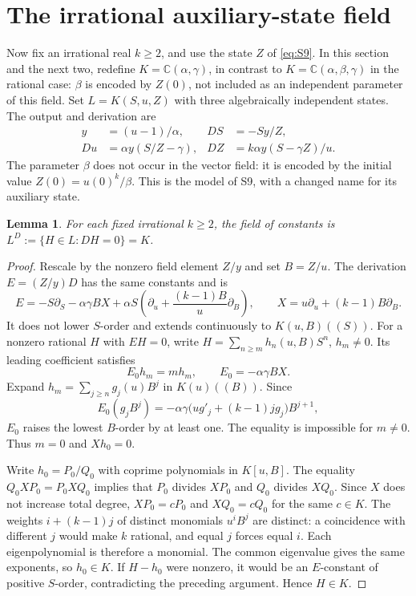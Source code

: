 \documentclass[10pt,a4paper]{article}
\newtheorem{lemma}[theorem]{Lemma}
\theoremstyle{definition}\newtheorem{definition}[theorem]{Definition}
\newcommand{\C}{\mathbb C}
\begin{document}
\section{The irrational auxiliary-state field}
\label{sec:irrational}
Now fix an irrational real $k\geq2$, and use the state $Z$ of
\eqref{eq:S9}. In this section and the next two, redefine
$K=\C(\alpha,\gamma)$, in contrast to $K=\C(\alpha,\beta,\gamma)$
in the rational case: $\beta$ is encoded by $Z(0)$, not included as an
independent parameter of this field. Set $L=K(S,u,Z)$ with three
algebraically independent states. The output
and derivation are
\begin{equation}
\begin{aligned}
y&=(u-1)/\alpha, & DS&=-Sy/Z,\\
Du&=\alpha y(S/Z-\gamma), &
DZ&=k\alpha y(S-\gamma Z)/u.
\end{aligned}
\label{eq:irrmodel}
\end{equation}
The parameter $\beta$ does not occur in the vector field: it is encoded
by the initial value $Z(0)=u(0)^k/\beta$. This is the model of S9,
with a changed name for its auxiliary state.

\begin{lemma}
\label{lem:irrconstants}
For each fixed irrational $k\geq2$, the field of constants is
$L^D:=\{H\in L:DH=0\}=K$.
\end{lemma}
\begin{proof}
Rescale by the nonzero field element $Z/y$ and set $B=Z/u$. The
derivation $E=(Z/y)D$ has the same constants and is
\begin{equation}
E=-S\partial_S-\alpha\gamma B X+
 \alpha S\left(\partial_u+\frac{(k-1)B}{u}\partial_B\right),
\qquad X=u\partial_u+(k-1)B\partial_B.
\label{eq:irrE}
\end{equation}
It does not lower $S$-order and extends continuously to
$K(u,B)((S))$. For a nonzero rational $H$ with $EH=0$, write
$H=\sum_{n\geq m}h_n(u,B)S^n$, $h_m\ne0$. Its leading coefficient
satisfies
\[
E_0h_m=mh_m,\qquad E_0=-\alpha\gamma B X.
\]
Expand $h_m=\sum_{j\geq n}g_j(u)B^j$ in $K(u)((B))$. Since
\[
E_0(g_jB^j)=-\alpha\gamma\bigl(ug'_j+(k-1)jg_j\bigr)B^{j+1},
\]
$E_0$ raises the lowest $B$-order by at least one. The equality is
impossible for $m\ne0$. Thus $m=0$ and $Xh_0=0$.

Write $h_0=P_0/Q_0$ with coprime polynomials in $K[u,B]$.
The equality $Q_0XP_0=P_0XQ_0$ implies that $P_0$ divides $XP_0$
and $Q_0$ divides $XQ_0$. Since $X$ does not increase total degree,
$XP_0=cP_0$ and $XQ_0=cQ_0$ for the same $c\in K$.
The weights $i+(k-1)j$ of distinct monomials $u^iB^j$ are distinct:
a coincidence with different $j$ would make $k$ rational, and equal
$j$ forces equal $i$. Each eigenpolynomial is therefore a monomial.
The common eigenvalue gives the same exponents, so $h_0\in K$.
If $H-h_0$ were nonzero, it would be an $E$-constant of positive
$S$-order, contradicting the preceding argument. Hence $H\in K$.
\end{proof}
\end{document}
